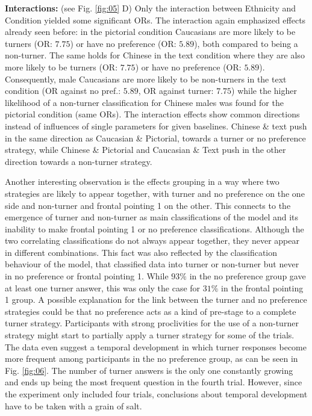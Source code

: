 \documentclass{frontiersSCNS} %
\begin{document}
\textbf{Interactions:} (see Fig. \ref{fig:05} D)
Only the interaction between Ethnicity and Condition yielded some significant ORs. The interaction again emphasized effects already seen before: in the pictorial condition Caucasians are more likely to be turners (OR: $7.75$) or have no preference (OR: $5.89$), both compared to being a non-turner. The same holds for Chinese in the text condition where they are also more likely to be turners (OR: $7.75$) or have no preference (OR: $5.89$). Consequently, male Caucasians are more likely to be non-turners in the text condition (OR against no pref.: $5.89$, OR against turner: $7.75$) while the higher likelihood of a non-turner classification for Chinese males was found for the pictorial condition (same ORs). The interaction effects show common directions instead of influences of single parameters for given baselines. Chinese \& text push in the same direction as Caucasian \& Pictorial, towards a turner or no preference strategy, while Chinese \& Pictorial and Caucasian \& Text push in the other direction towards a non-turner strategy.

Another interesting observation is the effects grouping in a way where two strategies are likely to appear together, with turner and no preference on the one side and non-turner and frontal pointing 1 on the other. This connects to the emergence of turner and non-turner as main classifications of the model and its inability to make frontal pointing 1 or no preference classifications. Although the two correlating classifications do not always appear together, they never appear in different combinations. This fact was also reflected by the classification behaviour of the model, that classified data into turner or non-turner but never in no preference or frontal pointing 1. While $93\%$ in the no preference group gave at least one turner answer, this was only the case for $31\%$ in the frontal pointing 1 group.
A possible explanation for the link between the turner and no preference strategies could be that no preference acts as a kind of pre-stage to a complete turner strategy. Participants with strong proclivities for the use of a non-turner strategy might start to partially apply a turner strategy for some of the trials.
The data even suggest a temporal development in which turner responses become more frequent among participants in the no preference group, as can be seen in Fig. \ref{fig:06}. The number of turner answers is the only one constantly growing and ends up being the most frequent question in the fourth trial. However, since the experiment only included four trials, conclusions about temporal development have to be taken with a grain of salt.
\end{document}
